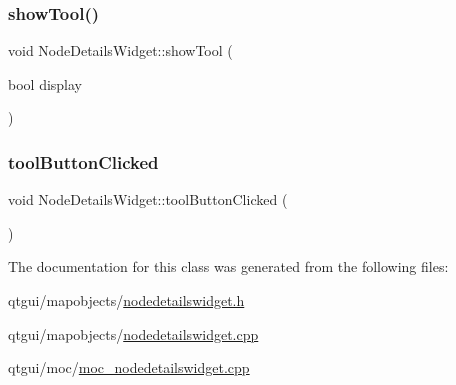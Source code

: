 \subsubsection{\texorpdfstring{showTool()}{showTool()}}
{\footnotesize\ttfamily void Node\+Details\+Widget\+::show\+Tool (\begin{DoxyParamCaption}\item[{bool}]{display }\end{DoxyParamCaption})}

\mbox{\label{class_node_details_widget_abe81e19113dd9e5bc52c293a840b4866}} 
\subsubsection{\texorpdfstring{toolButtonClicked}{toolButtonClicked}}
{\footnotesize\ttfamily void Node\+Details\+Widget\+::tool\+Button\+Clicked (\begin{DoxyParamCaption}{ }\end{DoxyParamCaption})\hspace{0.3cm}{\ttfamily [signal]}}



The documentation for this class was generated from the following files\+:\begin{DoxyCompactItemize}
\item 
qtgui/mapobjects/\mbox{\hyperlink{nodedetailswidget_8h}{nodedetailswidget.\+h}}\item 
qtgui/mapobjects/\mbox{\hyperlink{nodedetailswidget_8cpp}{nodedetailswidget.\+cpp}}\item 
qtgui/moc/\mbox{\hyperlink{moc__nodedetailswidget_8cpp}{moc\+\_\+nodedetailswidget.\+cpp}}\end{DoxyCompactItemize}
